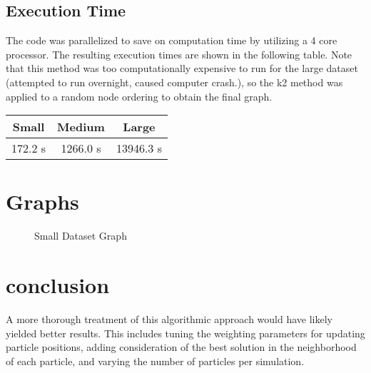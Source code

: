 \documentclass[twoside,11pt]{article}
\begin{document}
\subsection{Execution Time}
The code was parallelized to save on computation time by utilizing a 4 core processor. The resulting execution times are shown in the following table. Note that this method was too computationally expensive to run for the large dataset (attempted to run overnight, caused computer crash.), so the k2 method was applied to a random node ordering to obtain the final graph.

\begin{table}[!h]
\centering
\begin{tabular}{c|c|c}
     Small & Medium & Large  \\ \hline
     172.2 s & 1266.0 s & 13946.3 s 
\end{tabular}
\end{table}
\section{Graphs}
\begin{figure}[h]
    \centering
    \caption{Small Dataset Graph}
\end{figure}

\section{conclusion}
A more thorough treatment of this algorithmic approach would have likely yielded better results. This includes tuning the weighting parameters for updating particle positions, adding consideration of the best solution in the neighborhood of each particle, and varying the number of particles per simulation.
\end{document}
